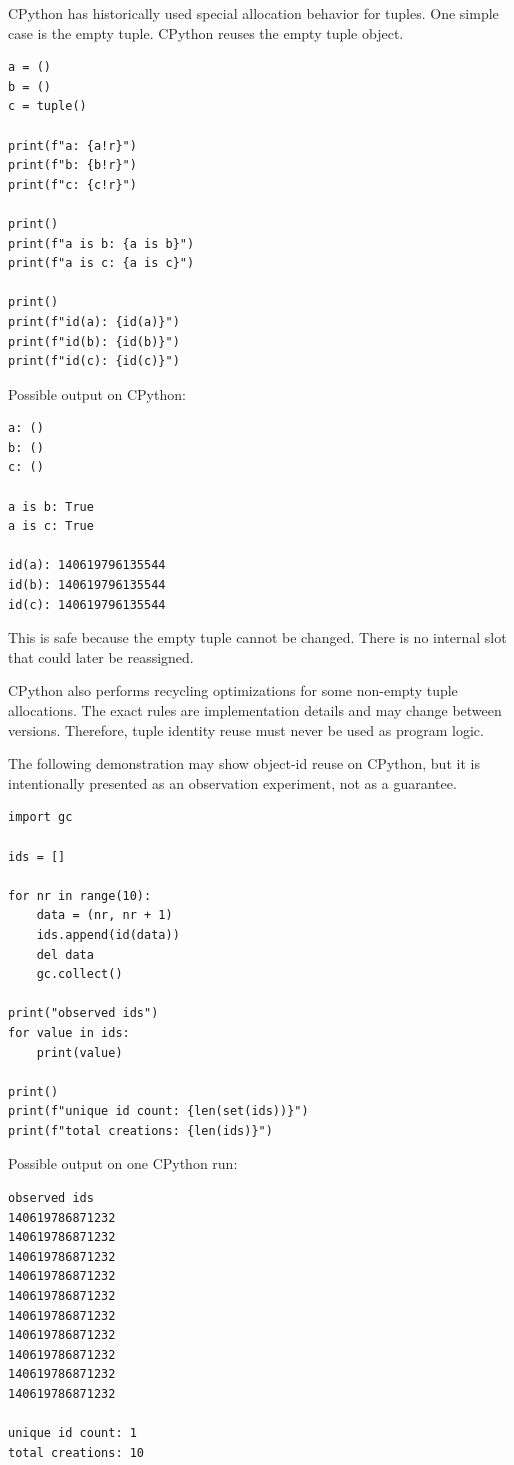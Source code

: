 CPython has historically used special allocation behavior for tuples. One simple case is the empty tuple. CPython reuses the empty tuple object.

\begin{verbatim}
a = ()
b = ()
c = tuple()

print(f"a: {a!r}")
print(f"b: {b!r}")
print(f"c: {c!r}")

print()
print(f"a is b: {a is b}")
print(f"a is c: {a is c}")

print()
print(f"id(a): {id(a)}")
print(f"id(b): {id(b)}")
print(f"id(c): {id(c)}")
\end{verbatim}

Possible output on CPython:

\begin{verbatim}
a: ()
b: ()
c: ()

a is b: True
a is c: True

id(a): 140619796135544
id(b): 140619796135544
id(c): 140619796135544
\end{verbatim}

This is safe because the empty tuple cannot be changed. There is no internal slot that could later be reassigned.

CPython also performs recycling optimizations for some non-empty tuple allocations. The exact rules are implementation details and may change between versions. Therefore, tuple identity reuse must never be used as program logic.

The following demonstration may show object-id reuse on CPython, but it is intentionally presented as an observation experiment, not as a guarantee.

\begin{verbatim}
import gc

ids = []

for nr in range(10):
    data = (nr, nr + 1)
    ids.append(id(data))
    del data
    gc.collect()

print("observed ids")
for value in ids:
    print(value)

print()
print(f"unique id count: {len(set(ids))}")
print(f"total creations: {len(ids)}")
\end{verbatim}

Possible output on one CPython run:

\begin{verbatim}
observed ids
140619786871232
140619786871232
140619786871232
140619786871232
140619786871232
140619786871232
140619786871232
140619786871232
140619786871232
140619786871232

unique id count: 1
total creations: 10
\end{verbatim}

